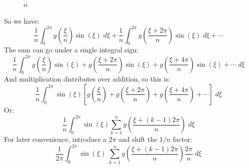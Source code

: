\documentclass[12pt, a4paper, twoside, openright]{book}
\begin{document}
\begin{figure}[ht]
\centering
{}
\caption{o}\label{o}
\end{figure}

So we have:
\begin{equation}
\frac{1}{n}   \int_0^{2\pi} g\left(\frac{\xi}{n}\right) \sin(\xi) \;d\xi
 + \frac{1}{n}   \int_0^{2\pi} g\left(\frac{\xi + 2\pi}{n} \right) \sin(\xi) \;d\xi
 + \cdots
\end{equation}
The sum can go under a single integral sign:
\begin{equation}
\frac{1}{n}
\int_0^{2\pi} g\left(\frac{\xi}{n}\right) \sin(\xi)
 + g\left(\frac{\xi + 2\pi}{n} \right) \sin(\xi) 
 + g\left(\frac{\xi + 4\pi}{n} \right) \sin(\xi) + \cdots \;d\xi
\end{equation}
And multiplication distributes over addition, so this is:
\begin{equation}
\frac{1}{n} \int_0^{2\pi} \sin(\xi)
\left[
g\left(\frac{\xi}{n} \right) + g\left(\frac{\xi + 2\pi}{n} \right)  +  
g\left(\frac{\xi + 4\pi}{n} \right) + \cdots 
\right] \;d\xi
\end{equation}
Or:
\begin{equation}
\frac{1}{n} \int_0^{2\pi} \sin(\xi)
 \sum_{k=1}^n g\left(\frac{\xi + (k-1) 2\pi}{n} \right) \;d\xi
\end{equation}
For later convenience, introduce a $2\pi$ and shift the $1/n$ factor:
\begin{equation}
\frac{1}{2\pi} \int_0^{2\pi} \sin(\xi) \;
 \sum_{k=1}^n g\left(\frac{\xi + (k-1) 2\pi}{n} \right) \frac{2\pi}{n} \;d\xi
 \end{equation}
\end{document}
